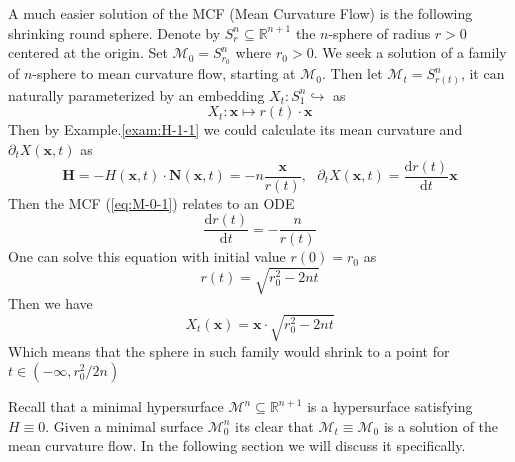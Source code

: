 A much easier solution of the MCF (Mean Curvature Flow) is the following shrinking round sphere. Denote by $S^n_r\subseteq\mathbb{R}^{n+1}$ the $n$-sphere of radius $r>0$ centered at the origin. Set $\mathcal{M}_0=S^n_{r_0}$ where $r_0>0$. We seek a solution of a family of $n$-sphere to mean curvature flow, starting at $\mathcal{M}_0$. Then let $\mathcal{M}_t=S^n_{r(t)}$, it can naturally parameterized by an embedding $X_t:S^n_1\hookrightarrow $ as
\begin{equation*}
    X_t:\boldsymbol{x}\mapsto r(t)\cdot\boldsymbol{x}
\end{equation*}
Then by Example.\ref{exam:H-1-1} we could calculate its mean curvature and $\partial_t X(\boldsymbol{x},t)$ as
\begin{equation*}
    \boldsymbol{H}=-H(\boldsymbol{x},t)\cdot\mathbf{N}(\boldsymbol{x},t)=-n\frac{\boldsymbol{x}}{r(t)},\,\,\,\, \partial_t X(\boldsymbol{x},t)=\frac{\mathrm{d}r(t)}{\mathrm{d}t}\boldsymbol{x}
\end{equation*}
Then the MCF (\ref{eq:M-0-1}) relates to an ODE
\begin{equation*}
    \frac{\mathrm{d}r(t)}{\mathrm{d}t}=-\frac{n}{r(t)}
\end{equation*}
One can solve this equation with initial value $r(0)=r_0$ as
\begin{equation*}
    r(t)=\sqrt{r^2_0-2nt}
\end{equation*}
Then we have
\begin{equation*}
    X_t(\boldsymbol{x})=\boldsymbol{x}\cdot\sqrt{r^2_0-2nt}
\end{equation*}
Which means that the sphere in such family would shrink to a point for $t\in (-\infty,r^2_0/2n)$

Recall that a minimal hypersurface $\mathcal{M}^n\subseteq\mathbb{R}^{n+1}$ is a hypersurface satisfying $H\equiv 0$. Given a minimal surface $\mathcal{M}^n_0$ its clear that $\mathcal{M}_t\equiv\mathcal{M}_0$ is a solution of the mean curvature flow. In the following section we will discuss it specifically.

